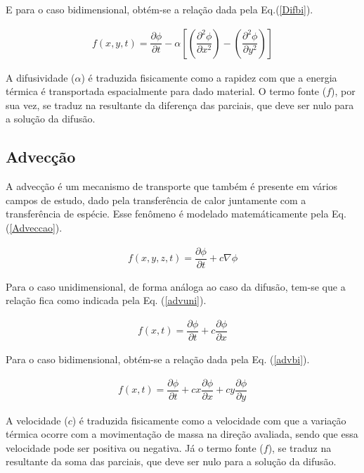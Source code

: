 	E para o caso bidimensional, obtém-se a relação dada pela Eq.(\ref{Difbi}).
	
\begin{align}
 \label{Difbi}
 f(x,y,t) = \dfrac{\partial \phi}{\partial t} - \alpha \left[ \left(\dfrac{\partial^2 \phi}{\partial x^2}\right) - \left(\dfrac{\partial^2 \phi}{\partial y^2}\right)\right]
\end{align}
	
	A difusividade ($\alpha$) é traduzida fisicamente como a rapidez com que a energia térmica é transportada espacialmente para dado material. O termo fonte ($f$), por sua vez, se traduz na resultante da diferença das parciais, que deve ser nulo para a solução da difusão. 

\subsection{Advecção}

\noindent

	A advecção é um mecanismo de transporte que também é presente em vários campos de estudo, dado pela transferência de calor juntamente com a transferência de espécie. Esse fenômeno é modelado matemáticamente pela Eq. (\ref{Adveccao}).
	
\begin{align}
\label{Adveccao}
f(x,y,z,t) = \dfrac{\partial \phi}{\partial t} + c \nabla \phi
\end{align}

	Para o caso unidimensional, de forma análoga ao caso da difusão, tem-se que a relação fica como indicada pela Eq. (\ref{advuni}).
	
\begin{align}
\label{advuni}
f(x,t) = \dfrac{\partial \phi}{\partial t} + c \dfrac{\partial \phi}{\partial x}
\end{align}

	Para o caso bidimensional, obtém-se a relação dada pela Eq. (\ref{advbi}).
	
\begin{align}
\label{advbi}
f(x,t) = \dfrac{\partial \phi}{\partial t} + cx \dfrac{\partial \phi}{\partial x} + cy \dfrac{\partial \phi}{\partial y}
\end{align}
	
	A velocidade ($c$) é traduzida fisicamente como a velocidade com que a variação térmica ocorre com a movimentação de massa na direção avaliada, sendo que essa velocidade pode ser positiva ou negativa. Já o termo fonte ($f$), se traduz na resultante da soma das parciais, que deve ser nulo para a solução da difusão.

